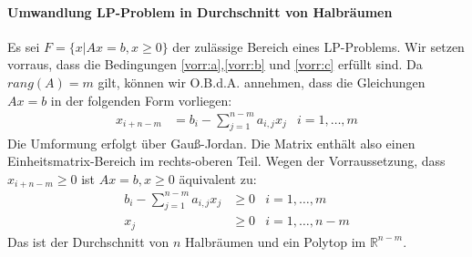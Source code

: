 \paragraph*{Umwandlung LP-Problem in Durchschnitt von Halbräumen}
Es sei $F = \{ x | Ax = b , x \geq 0 \}$ der zulässige Bereich eines LP-Problems. Wir setzen vorraus, dass die Bedingungen \ref{vorr:a},\ref{vorr:b} und \ref{vorr:c} erfüllt sind. Da $rang(A) = m$ gilt, können wir O.B.d.A. annehmen, dass die Gleichungen $Ax=b$ in der folgenden Form vorliegen:
\begin{align}
x_{i+n-m} &= b_i - \sum_{j=1}^{n-m} a_{i,j}x_j & i = 1,\dotsc,m
\end{align}
Die Umformung erfolgt über Gauß-Jordan. Die Matrix enthält also einen Einheitsmatrix-Bereich im rechts-oberen Teil. Wegen der Vorraussetzung, dass $x_{i+n-m} \geq 0$ ist $Ax=b, x \geq 0$ äquivalent zu:
\begin{align}
 b_i - \sum_{j=1}^{n-m} a_{i,j}x_j &\geq 0 & i = 1,\dotsc,m\\
 x_j &\geq 0 & i = 1,\dotsc,n-m
\end{align}
Das ist der Durchschnitt von $n$ Halbräumen und ein Polytop im $\mathbb R^{n-m}$.
